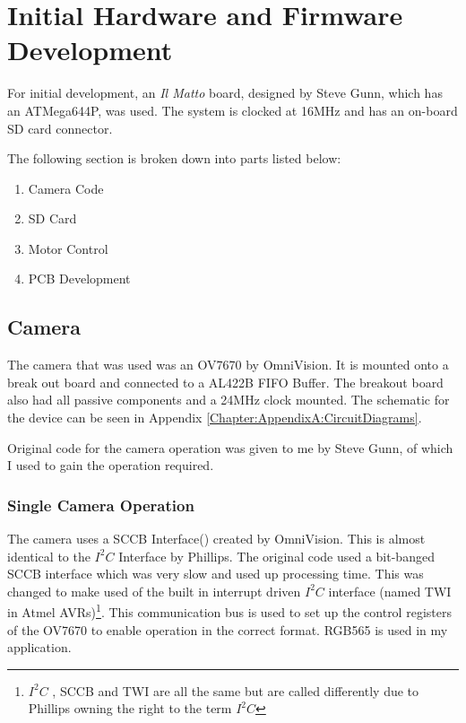 \chapter{Initial Hardware and Firmware Development} \label{Chapter:HardwareDevelopment}
For initial development, an \textit{Il Matto} board, designed by Steve Gunn, which has an ATMega644P, was used. The system is clocked at 16MHz and has an on-board SD card connector. 

The following section is broken down into parts listed below:
\begin{enumerate}
\item Camera Code
\item SD Card
\item Motor Control
\item PCB Development
\end{enumerate}

\section{Camera} \label{Section:Camera}

The camera that was used was an OV7670 by OmniVision. It is mounted onto a break out board and connected to a AL422B FIFO Buffer. The breakout board also had all passive components and a 24MHz clock mounted. The schematic for the device can be seen in Appendix \ref{Chapter:AppendixA:CircuitDiagrams}.

Original code for the camera operation was given to me by Steve Gunn, of which I used to gain the operation required. 

\subsection{Single Camera Operation}

The camera uses a SCCB Interface(\cite{SCCB_Interface}) created by OmniVision. This is almost identical to the $I^{2}C$ Interface by Phillips. The original code used a bit-banged SCCB interface which was very slow and used up processing time. This was changed to make used of the built in interrupt driven $I^{2}C$ interface (named TWI in Atmel AVRs)\footnote{$I^{2}C$ , SCCB and TWI are all the same but are called differently due to Phillips owning the right to the term $I^{2}C$}. This communication bus is used to set up the control registers of the OV7670 to enable operation in the correct format. RGB565 is used in my application.

